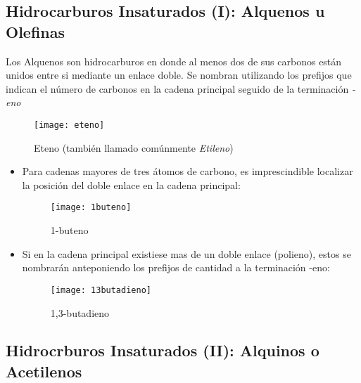 \subsection{Hidrocarburos Insaturados (I): Alquenos u Olefinas}

Los Alquenos son hidrocarburos en donde al menos dos de sus carbonos están unidos entre si mediante un enlace doble. Se nombran utilizando los prefijos que indican el número de carbonos en la cadena principal seguido de la terminación \emph{-eno}\\
\begin{figure}[h!]
	\centering
	\texttt{[image: eteno]}
	\captionsetup{labelformat=empty}
	\caption{Eteno (también llamado comúnmente \emph{Etileno})}
\end{figure}

\begin{itemize}

\item Para cadenas mayores de tres átomos de carbono, es imprescindible localizar la posición del doble enlace en la cadena principal:
\begin{figure}[h!]
	\centering
	\texttt{[image: 1buteno]}
	\captionsetup{labelformat=empty}
	\caption{1-buteno}
\end{figure}

\item Si en la cadena principal existiese mas de un doble enlace (polieno), estos se nombrarán anteponiendo los prefijos de cantidad a la terminación -eno:

\begin{figure}[h!]
	\centering
	\texttt{[image: 13butadieno]}
	\captionsetup{labelformat=empty}
	\caption{1,3-butadieno}
	\end{figure}
\end{itemize}

\subsection{Hidrocrburos Insaturados (II): Alquinos o Acetilenos}

